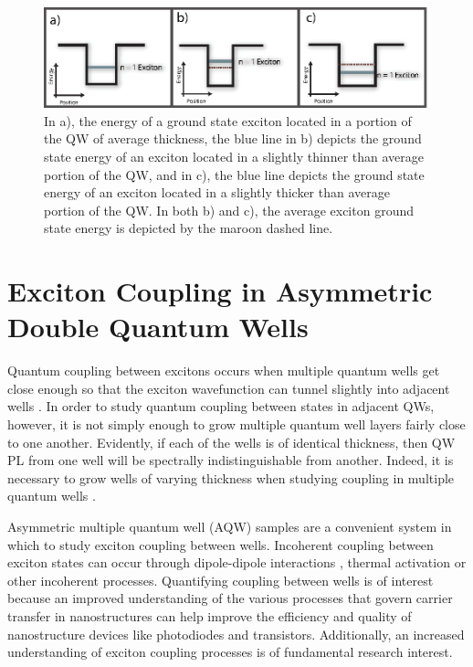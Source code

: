 \begin{figure}[t!]
\label{rel-thickness}
\centering
\includegraphics[width = .9\textwidth]{rel-thickness.eps}
\caption{\doublespacing In a), the energy of a ground state exciton located in a portion of the QW of average thickness, the blue line in b) depicts the ground state energy of an exciton located in a slightly thinner than average portion of the QW,  and in c), the blue line depicts the ground state energy of an exciton located in a slightly thicker than average portion of the QW. In both b) and c), the average exciton ground state energy is depicted by the maroon dashed line.}
\end{figure}

\section{Exciton Coupling in Asymmetric Double Quantum Wells}

\indent Quantum coupling between excitons occurs when multiple quantum wells get close enough so that the exciton wavefunction can tunnel slightly into adjacent wells \cite{griffiths, davies}. In order to study quantum coupling between states in adjacent QWs, however, it is not simply enough to grow multiple quantum well layers fairly close to one another. Evidently, if each of the wells is of identical thickness, then QW PL  from one well will be spectrally indistinguishable from another. Indeed, it is necessary to grow wells of varying thickness when studying coupling in multiple quantum wells \cite{hegartycouple}. 

\indent Asymmetric multiple quantum well (AQW) samples are a convenient system in which to study exciton coupling between wells. Incoherent coupling between exciton states can occur through dipole-dipole interactions \cite{tomita}, thermal activation \cite{Borri} or other incoherent processes. Quantifying coupling between wells is of interest because an improved understanding of the various processes that govern carrier transfer in nanostructures can help improve the efficiency and quality of nanostructure devices like photodiodes and transistors. Additionally, an increased understanding of exciton coupling processes is of fundamental research interest.



